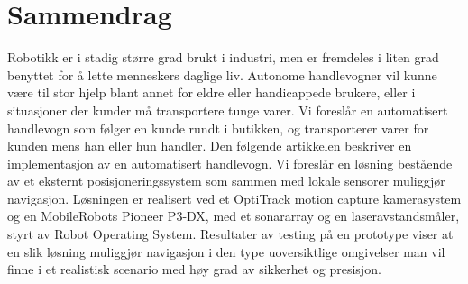 

\begingroup
\let\clearpage\relax
\let\cleardoublepage\relax
\let\cleardoublepage\relax

\chapter*{Sammendrag} %
 Robotikk er i stadig større grad brukt i industri, men er fremdeles i liten
grad benyttet for å lette menneskers daglige liv. Autonome handlevogner vil
kunne være til stor hjelp blant annet for eldre eller handicappede brukere,
eller i situasjoner der kunder må transportere tunge varer.
Vi foreslår en automatisert handlevogn som følger en kunde rundt i butikken,
og transporterer varer for kunden mens han eller hun handler.
Den følgende artikkelen beskriver en implementasjon av en automatisert
handlevogn. Vi foreslår en løsning bestående av et eksternt
posisjoneringssystem som sammen med lokale sensorer muliggjør navigasjon. Løsningen er realisert ved et OptiTrack motion capture
kamerasystem og en MobileRobots Pioneer P3-DX, med et sonararray og en
laseravstandsmåler, styrt av Robot Operating System.
Resultater av testing på en prototype viser at en slik løsning muliggjør
navigasjon i den type uoversiktlige omgivelser man vil finne i et realistisk
scenario med høy grad av sikkerhet og presisjon.
\endgroup			

\vfill